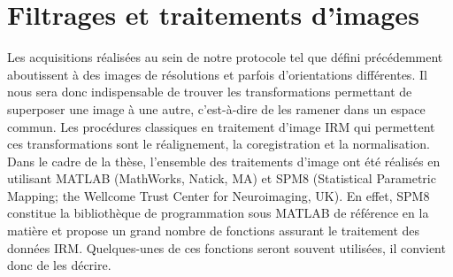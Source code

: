 \section{Filtrages et traitements d’images}
\label{sec:pretrait}
Les acquisitions réalisées au sein de notre protocole tel que défini précédemment aboutissent
à des images de résolutions et parfois d’orientations différentes. Il nous sera donc indispensable de
trouver les transformations permettant de superposer une image à une autre, c’est-à-dire de les
ramener dans un espace commun. Les procédures classiques en traitement d’image IRM qui
permettent ces transformations sont le réalignement, la coregistration et la normalisation.\\
Dans le cadre de la thèse, l’ensemble des traitements d’image ont été réalisés en utilisant
MATLAB (MathWorks, Natick, MA) et SPM8 (Statistical Parametric Mapping; the Wellcome Trust
Center for Neuroimaging, UK). En effet, SPM8 constitue la bibliothèque de programmation sous
MATLAB de référence en la matière et propose un grand nombre de fonctions assurant le traitement
des données IRM. Quelques-unes de ces fonctions seront souvent utilisées, il convient donc de les
décrire.

